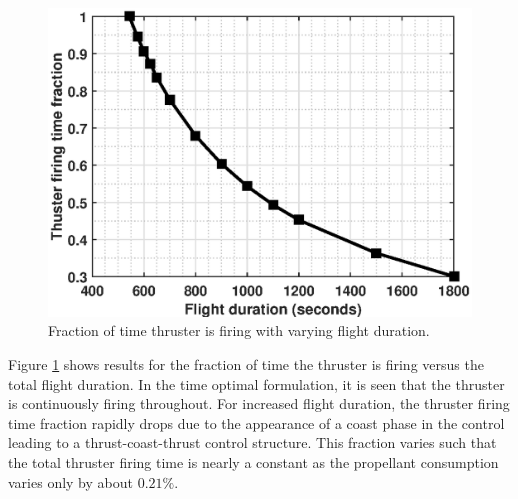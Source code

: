 \begin{figure}[H]
	\centering\includegraphics[width=0.90\linewidth]{ThrusterOnTime.eps}
	\caption{Fraction of time thruster is firing with varying flight duration.}
	\label{fig:parametric:5}
\end{figure}
Figure \ref{fig:parametric:5} shows results for the fraction of time the thruster is firing versus the total flight duration. In the time optimal formulation, it is seen that the thruster is continuously firing throughout. For increased flight duration, the thruster firing time fraction rapidly drops due to the appearance of a coast phase in the control leading to a thrust-coast-thrust control structure. This fraction varies such that the total thruster firing time is nearly a constant as the propellant consumption varies only by about $0.21\%$.

